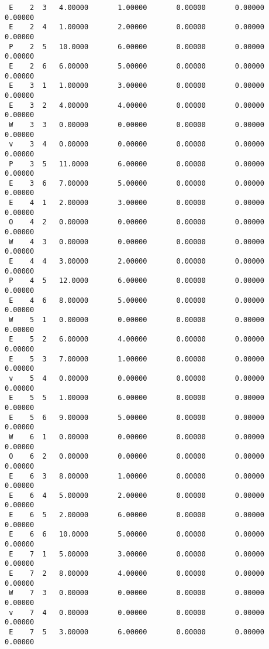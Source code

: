 \begin{verbatim}
 E    2  3   4.00000       1.00000       0.00000       0.00000       0.00000    
 E    2  4   1.00000       2.00000       0.00000       0.00000       0.00000    
 P    2  5   10.0000       6.00000       0.00000       0.00000       0.00000    
 E    2  6   6.00000       5.00000       0.00000       0.00000       0.00000    
 E    3  1   1.00000       3.00000       0.00000       0.00000       0.00000    
 E    3  2   4.00000       4.00000       0.00000       0.00000       0.00000    
 W    3  3   0.00000       0.00000       0.00000       0.00000       0.00000    
 v    3  4   0.00000       0.00000       0.00000       0.00000       0.00000    
 P    3  5   11.0000       6.00000       0.00000       0.00000       0.00000    
 E    3  6   7.00000       5.00000       0.00000       0.00000       0.00000    
 E    4  1   2.00000       3.00000       0.00000       0.00000       0.00000    
 O    4  2   0.00000       0.00000       0.00000       0.00000       0.00000    
 W    4  3   0.00000       0.00000       0.00000       0.00000       0.00000    
 E    4  4   3.00000       2.00000       0.00000       0.00000       0.00000    
 P    4  5   12.0000       6.00000       0.00000       0.00000       0.00000    
 E    4  6   8.00000       5.00000       0.00000       0.00000       0.00000    
 W    5  1   0.00000       0.00000       0.00000       0.00000       0.00000    
 E    5  2   6.00000       4.00000       0.00000       0.00000       0.00000    
 E    5  3   7.00000       1.00000       0.00000       0.00000       0.00000    
 v    5  4   0.00000       0.00000       0.00000       0.00000       0.00000    
 E    5  5   1.00000       6.00000       0.00000       0.00000       0.00000    
 E    5  6   9.00000       5.00000       0.00000       0.00000       0.00000    
 W    6  1   0.00000       0.00000       0.00000       0.00000       0.00000    
 O    6  2   0.00000       0.00000       0.00000       0.00000       0.00000    
 E    6  3   8.00000       1.00000       0.00000       0.00000       0.00000    
 E    6  4   5.00000       2.00000       0.00000       0.00000       0.00000    
 E    6  5   2.00000       6.00000       0.00000       0.00000       0.00000    
 E    6  6   10.0000       5.00000       0.00000       0.00000       0.00000    
 E    7  1   5.00000       3.00000       0.00000       0.00000       0.00000    
 E    7  2   8.00000       4.00000       0.00000       0.00000       0.00000    
 W    7  3   0.00000       0.00000       0.00000       0.00000       0.00000    
 v    7  4   0.00000       0.00000       0.00000       0.00000       0.00000    
 E    7  5   3.00000       6.00000       0.00000       0.00000       0.00000    

\end{verbatim}
